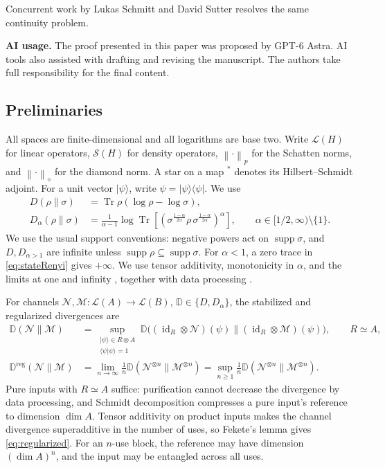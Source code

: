 \documentclass[11pt,letterpaper]{article}
\numberwithin{equation}{section}
\newcommand{\N}{\mathcal N}
\newcommand{\M}{\mathcal M}
\newcommand{\id}{\operatorname{id}}
\newcommand{\Tr}{\operatorname{Tr}}
\newcommand{\supp}{\operatorname{supp}}
\newcommand{\reg}{\mathrm{reg}}
\newcommand{\Dt}{D}
\newcommand{\cL}{\mathcal L}
\newcommand{\cS}{\mathcal S}
\newcommand{\norm}[1]{\left\lVert#1\right\rVert}
\begin{document}
Concurrent work by Lukas Schmitt and David Sutter \cite{SchmittSutter} resolves the same continuity problem.\par\medskip


\noindent\textbf{AI usage.} 
The proof presented in this paper was proposed by GPT-6 Astra. AI tools also assisted with drafting and revising the manuscript. The authors take full responsibility for the final content.


\subsection{Preliminaries}\label{sec:prelim}
All spaces are finite-dimensional and all logarithms are base two. Write $\cL(H)$ for linear operators, $\cS(H)$ for density operators, $\norm{\cdot}_p$ for the Schatten norms, and $\norm{\cdot}_\diamond$ for the diamond norm. A star on a map ${}^*$ denotes its Hilbert--Schmidt adjoint. For a unit vector $|\psi\rangle$, write $\psi=|\psi\rangle\!\langle\psi|$. We use
\begin{align}
 D(\rho\|\sigma)&=\Tr\rho(\log\rho-\log\sigma),\label{eq:stateD}\\
 \Dt_\alpha(\rho\|\sigma)
 &=\frac1{\alpha-1}\log\Tr\!\left[
 \left(\sigma^{\frac{1-\alpha}{2\alpha}}\rho\,
              \sigma^{\frac{1-\alpha}{2\alpha}}\right)^\alpha\right],
 \qquad \alpha\in[1/2,\infty)\setminus\{1\}.
 \label{eq:stateRenyi}
\end{align}
We use the usual support conventions: negative powers act on $\supp\sigma$, and $D,\Dt_{\alpha>1}$ are infinite unless $\supp\rho\subseteq\supp\sigma$. For $\alpha<1$, a zero trace in \eqref{eq:stateRenyi} gives $+\infty$. We use tensor additivity, monotonicity in $\alpha$, and the limits at one and infinity \cite{MLDFT}, together with data processing \cite{FL,Beigi}.

For channels $\N,\M:\cL(A)\to\cL(B)$, $\mathbb D\in\{D,\Dt_\alpha\}$, the stabilized and regularized divergences are
\begin{align}
 \mathbb D(\N\|\M)
 &=\sup_{\substack{|\psi\rangle\in R\otimes A\\\langle\psi|\psi\rangle=1}}
 \mathbb D\bigl((\id_R\otimes\N)(\psi)\|
                     (\id_R\otimes\M)(\psi)\bigr),
 \qquad R\simeq A,\label{eq:channel}\\
 \mathbb D^{\reg}(\N\|\M)
 &=\lim_{n\to\infty}\frac1n\mathbb D(\N^{\otimes n}\|\M^{\otimes n})
 =\sup_{n\ge1}\frac1n\mathbb D(\N^{\otimes n}\|\M^{\otimes n}).
 \label{eq:regularized}
\end{align}
Pure inputs with $R\simeq A$ suffice: purification cannot decrease the divergence by data processing, and Schmidt decomposition compresses a pure input's reference to dimension $\dim A$. Tensor additivity on product inputs makes the channel divergence superadditive in the number of uses, so Fekete's lemma gives \eqref{eq:regularized}. For an $n$-use block, the reference may have dimension $(\dim A)^n$, and the input may be entangled across all uses.
\end{document}
